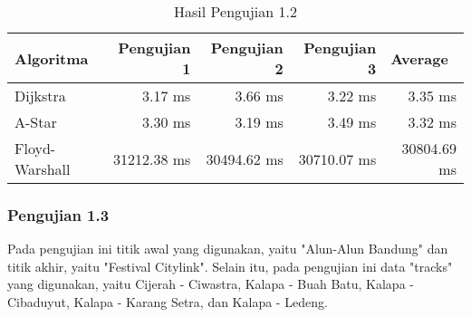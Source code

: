 \begin{table}[H]
\centering
\caption{Hasil Pengujian 1.2}
\label{tab:hasiluji1.2}
{\large
\begin{tabular}{|l|r|r|r|r|}
\hline
\textbf{Algoritma} & \textbf{Pengujian 1} & \textbf{Pengujian 2} & \textbf{Pengujian 3} & \multicolumn{1}{l|}{\textbf{Average}}\\ \hline
Dijkstra           & 3.17 ms              & 3.66 ms             & 3.22 ms       &       3.35 ms             \\ \hline
A-Star            & 3.30 ms              & 3.19 ms              & 3.49 ms       &       3.32 ms             \\ \hline
Floyd-Warshall     & 31212.38 ms              & 30494.62 ms               & 30710.07 ms     &   30804.69 ms            \\ \hline
\end{tabular}
}
\end{table}

\subsubsection{Pengujian 1.3}
Pada pengujian ini titik awal yang digunakan, yaitu "Alun-Alun Bandung" dan titik akhir, yaitu "Festival Citylink". Selain itu, pada pengujian ini data "tracks" yang digunakan, yaitu Cijerah - Ciwastra, Kalapa - Buah Batu, Kalapa - Cibaduyut, Kalapa - Karang Setra, dan Kalapa - Ledeng.

\begin{comment}
\begin{table}[H]
\centering
\caption{Data Pengujian 1.3}
\label{tab:data1.3}
{\large
\begin{tabular}{|l|l|}
\hline
\textbf{trackId}       & \textbf{trackName}             \\ \hline
cijerahciwastra & Cijerah - Ciwastra \\ \hline
kalapabuahbatu & Kalapa - Buah Batu \\ \hline
kalapacibaduyut   & Kalapa - Cibaduyut     \\ \hline
kalapakarangsetra        & Kalapa - Karang Setra             \\ \hline
kalapaledeng        & Kalapa - Ledeng             \\ \hline
\end{tabular}
}
\end{table}
\end{comment}

